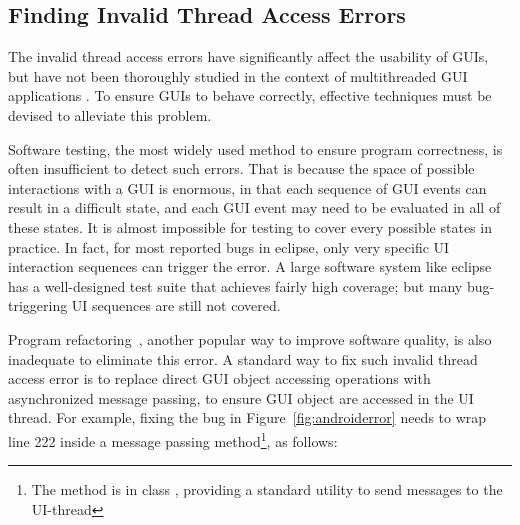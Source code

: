 


\subsection{Finding Invalid Thread Access Errors}

The invalid thread access errors have significantly affect the
usability of GUIs, but have not been thoroughly studied in
the context of multithreaded GUI applications . To ensure GUIs
to behave correctly, effective
techniques must be devised to alleviate this problem.


Software testing, the most widely used method to ensure program correctness,
is often insufficient to detect such errors. That is because the space of possible interactions
with a GUI is enormous, in that each sequence of GUI events can result in
a difficult state, and each GUI event may need to be evaluated in all of
these states. It is almost impossible for testing to cover every possible
states in practice. In fact, for most reported bugs in eclipse, only very specific
UI interaction sequences can trigger the error. A large software system like eclipse
has a well-designed test suite that achieves fairly high coverage; but many
 bug-triggering UI sequences are still not covered.

Program refactoring~\cite{Mens:2004}, another popular way to improve software quality,
is also inadequate to eliminate this error.  A standard way to fix such
invalid thread access error is to replace direct GUI object accessing operations
with asynchronized message passing, to ensure GUI object are accessed in
the UI thread. For example, fixing the bug in Figure~\ref{fig:androiderror}
needs to wrap line 222 inside a  message passing method\footnote{The
 method is in class , providing
a standard utility to send messages to the UI-thread}, as follows:


